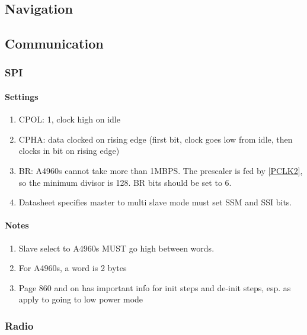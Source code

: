 \documentclass{scrreprt}
\begin{document}
	\subsection{Navigation}
	
	\subsection{Communication}
	\subsubsection{SPI}
	\paragraph{Settings}
	\begin{enumerate}
		\item CPOL: 1, clock high on idle
		\item CPHA: data clocked on rising edge (first bit, clock goes low from idle, then clocks in bit on rising edge)
		\item BR: A4960s cannot take more than 1MBPS.  The prescaler is fed by \autoref{PCLK2}, so the minimum divisor is 128\label{A4960MAXSPI}.  BR bits should be set to 6.
		\item Datasheet specifies master to multi slave mode must set SSM and SSI bits.
	\end{enumerate}
	\paragraph{Notes}
	\begin{enumerate}
		\item Slave select to A4960s MUST go high between words.
		\item For A4960s, a word is 2 bytes
		\item Page 860 and on has important info for init steps and de-init steps, esp. as apply to going to low power mode
	\end{enumerate}
	\subsubsection{Radio}
\end{document}
